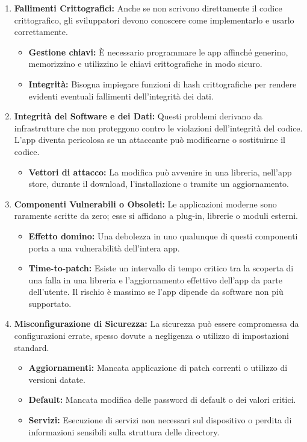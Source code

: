 \documentclass{article}
\begin{document}
\begin{enumerate}
    \item \textbf{Fallimenti Crittografici:} Anche se non scrivono direttamente il codice crittografico, gli sviluppatori devono conoscere come implementarlo e usarlo correttamente.
    \begin{itemize}
        \item \textbf{Gestione chiavi:} È necessario programmare le app affinché generino, memorizzino e utilizzino le chiavi crittografiche in modo sicuro.
        \item \textbf{Integrità:} Bisogna impiegare funzioni di hash crittografiche per rendere evidenti eventuali fallimenti dell'integrità dei dati.
    \end{itemize}

    \item \textbf{Integrità del Software e dei Dati:} Questi problemi derivano da infrastrutture che non proteggono contro le violazioni dell'integrità del codice. L'app diventa pericolosa se un attaccante può modificarne o sostituirne il codice.
    \begin{itemize}
        \item \textbf{Vettori di attacco:} La modifica può avvenire in una libreria, nell'app store, durante il download, l'installazione o tramite un aggiornamento.
    \end{itemize}

    \item \textbf{Componenti Vulnerabili o Obsoleti:} Le applicazioni moderne sono raramente scritte da zero; esse si affidano a plug-in, librerie o moduli esterni.
    \begin{itemize}
        \item \textbf{Effetto domino:} Una debolezza in uno qualunque di questi componenti porta a una vulnerabilità dell'intera app.
        \item \textbf{Time-to-patch:} Esiste un intervallo di tempo critico tra la scoperta di una falla in una libreria e l'aggiornamento effettivo dell'app da parte dell'utente. Il rischio è massimo se l'app dipende da software non più supportato.
    \end{itemize}

    \item \textbf{Misconfigurazione di Sicurezza:} La sicurezza può essere compromessa da configurazioni errate, spesso dovute a negligenza o utilizzo di impostazioni standard.
    \begin{itemize}
        \item \textbf{Aggiornamenti:} Mancata applicazione di patch correnti o utilizzo di versioni datate.
        \item \textbf{Default:} Mancata modifica delle password di default o dei valori critici.
        \item \textbf{Servizi:} Esecuzione di servizi non necessari sul dispositivo o perdita di informazioni sensibili sulla struttura delle directory.
    \end{itemize}
\end{enumerate}
\end{document}

